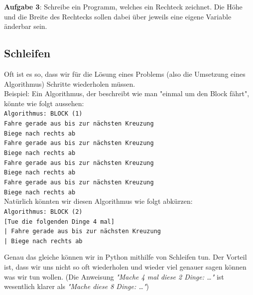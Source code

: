 \documentclass[ngerman,11pt]{article}
\begin{document}
    \textbf{Aufgabe 3}: Schreibe ein Programm, welches ein Rechteck zeichnet.
    Die Höhe und die Breite des Rechtecks sollen dabei über jeweils eine eigene Variable änderbar sein.

    \newpage

    \subsection{Schleifen}

    Oft ist es so, dass wir für die Lösung eines Problems (also die Umsetzung eines Algorithmus)
    Schritte wiederholen müssen. \\

    Beispiel: Ein Algorithmus, der beschreibt wie man "einmal um den Block fährt",
    könnte wie folgt aussehen: \\

    {\color{red}\verb_Algorithmus: BLOCK (1)_} \\
    \verb_Fahre gerade aus bis zur nächsten Kreuzung_ \\
    \verb_Biege nach rechts ab_ \\
    \verb_Fahre gerade aus bis zur nächsten Kreuzung_ \\
    \verb_Biege nach rechts ab_ \\
    \verb_Fahre gerade aus bis zur nächsten Kreuzung_ \\
    \verb_Biege nach rechts ab_ \\
    \verb_Fahre gerade aus bis zur nächsten Kreuzung_ \\
    \verb_Biege nach rechts ab_ \\

    Natürlich könnten wir diesen Algorithmus wie folgt abkürzen: \\

    {\color{red}\verb_Algorithmus: BLOCK (2)_} \\
    \verb_[Tue die folgenden Dinge 4 mal]_ \\
    \verb_| Fahre gerade aus bis zur nächsten Kreuzung_ \\
    \verb_| Biege nach rechts ab_ \\


    Genau das gleiche können wir in Python mithilfe von Schleifen tun.
    Der Vorteil ist, dass wir uns nicht so oft wiederholen und wieder viel
    genauer sagen können was wir tun wollen.
    (Die Anweisung \textit{"Mache 4 mal diese 2 Dinge: \dots"} ist wesentlich klarer als \textit{"Mache diese 8 Dinge: \dots"})
\end{document}
